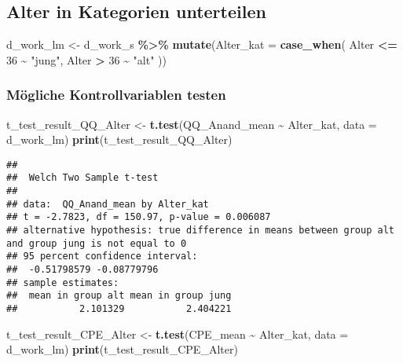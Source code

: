 \documentclass[
]{article}
\newenvironment{Shaded}{\begin{snugshade}}{\end{snugshade}}
\newcommand{\AttributeTok}[1]{\textcolor[rgb]{0.13,0.29,0.53}{#1}}
\newcommand{\DecValTok}[1]{\textcolor[rgb]{0.00,0.00,0.81}{#1}}
\newcommand{\FunctionTok}[1]{\textcolor[rgb]{0.13,0.29,0.53}{\textbf{#1}}}
\newcommand{\NormalTok}[1]{#1}
\newcommand{\OtherTok}[1]{\textcolor[rgb]{0.56,0.35,0.01}{#1}}
\newcommand{\SpecialCharTok}[1]{\textcolor[rgb]{0.81,0.36,0.00}{\textbf{#1}}}
\newcommand{\StringTok}[1]{\textcolor[rgb]{0.31,0.60,0.02}{#1}}
\begin{document}
\subsection{Alter in Kategorien
unterteilen}\label{alter-in-kategorien-unterteilen}

\begin{Shaded}
\begin{Highlighting}[]
\NormalTok{d\_work\_lm }\OtherTok{\textless{}{-}}\NormalTok{ d\_work\_s }\SpecialCharTok{\%\textgreater{}\%} 
  \FunctionTok{mutate}\NormalTok{(}\AttributeTok{Alter\_kat =} \FunctionTok{case\_when}\NormalTok{(}
\NormalTok{    Alter }\SpecialCharTok{\textless{}=} \DecValTok{36} \SpecialCharTok{\textasciitilde{}} \StringTok{"jung"}\NormalTok{,}
\NormalTok{    Alter }\SpecialCharTok{\textgreater{}} \DecValTok{36} \SpecialCharTok{\textasciitilde{}} \StringTok{"alt"}
\NormalTok{  ))}
\end{Highlighting}
\end{Shaded}

\subsubsection{Mögliche Kontrollvariablen
testen}\label{muxf6gliche-kontrollvariablen-testen}

\begin{Shaded}
\begin{Highlighting}[]
\NormalTok{t\_test\_result\_QQ\_Alter }\OtherTok{\textless{}{-}} \FunctionTok{t.test}\NormalTok{(QQ\_Anand\_mean }\SpecialCharTok{\textasciitilde{}}\NormalTok{ Alter\_kat, }\AttributeTok{data =}\NormalTok{ d\_work\_lm)}
\FunctionTok{print}\NormalTok{(t\_test\_result\_QQ\_Alter)}
\end{Highlighting}
\end{Shaded}

\begin{verbatim}
## 
##  Welch Two Sample t-test
## 
## data:  QQ_Anand_mean by Alter_kat
## t = -2.7823, df = 150.97, p-value = 0.006087
## alternative hypothesis: true difference in means between group alt and group jung is not equal to 0
## 95 percent confidence interval:
##  -0.51798579 -0.08779796
## sample estimates:
##  mean in group alt mean in group jung 
##           2.101329           2.404221
\end{verbatim}

\begin{Shaded}
\begin{Highlighting}[]
\NormalTok{t\_test\_result\_CPE\_Alter }\OtherTok{\textless{}{-}} \FunctionTok{t.test}\NormalTok{(CPE\_mean }\SpecialCharTok{\textasciitilde{}}\NormalTok{ Alter\_kat, }\AttributeTok{data =}\NormalTok{ d\_work\_lm)}
\FunctionTok{print}\NormalTok{(t\_test\_result\_CPE\_Alter)}
\end{Highlighting}
\end{Shaded}
\end{document}
